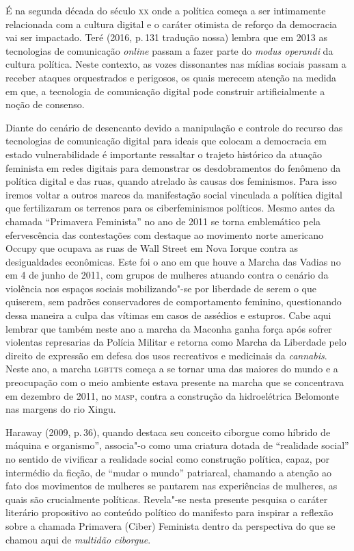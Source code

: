 É na segunda década do século \textsc{xx} onde a política começa a ser
intimamente relacionada com a cultura digital e o caráter otimista de
reforço da democracia vai ser impactado. Teré (2016, p.\,131 tradução
nossa) lembra que em 2013 as tecnologias de comunicação \textit{online} passam a
fazer parte do \textit{modus operandi} da cultura política. Neste
contexto, as vozes dissonantes nas mídias sociais passam a receber
ataques orquestrados e perigosos, os quais merecem atenção na medida em
que, a tecnologia de comunicação digital pode construir artificialmente
a noção de consenso.

Diante do cenário de desencanto devido a manipulação e controle do
recurso das tecnologias de comunicação digital para ideais que colocam a
democracia em estado vulnerabilidade é importante ressaltar o trajeto
histórico da atuação feminista em redes digitais para demonstrar os
desdobramentos do fenômeno da política digital e das ruas, quando
atrelado às causas dos feminismos. Para isso iremos voltar a outros
marcos da manifestação social vinculada a política digital que
fertilizaram os terrenos para os ciberfeminismos políticos. Mesmo antes
da chamada ``Primavera Feminista'' no ano de 2011 se torna emblemático
pela efervescência das contestações com destaque ao movimento norte
americano Occupy que ocupava as ruas de Wall Street em Nova Iorque
contra as desigualdades econômicas. Este foi o ano em que houve a Marcha
das Vadias no em 4 de junho de 2011, com grupos de mulheres atuando
contra o cenário da violência nos espaços sociais mobilizando"-se por
liberdade de serem o que quiserem, sem padrões conservadores de
comportamento feminino, questionando dessa maneira a culpa das vítimas
em casos de assédios e estupros. Cabe aqui lembrar que também neste ano
a marcha da Maconha ganha força após sofrer violentas represarias da
Polícia Militar e retorna como Marcha da Liberdade pelo direito de
expressão em defesa dos usos recreativos e medicinais da
\textit{cannabis}. Neste ano, a marcha \textsc{lgbtts} começa a se tornar uma das
maiores do mundo e a preocupação com o meio ambiente estava presente na
marcha que se concentrava em dezembro de 2011, no \textsc{masp}, contra a
construção da hidroelétrica Belomonte nas margens do rio Xingu.

Haraway (2009, p.\,36), quando destaca seu conceito ciborgue como híbrido
de máquina e organismo'', associa"-o como uma criatura dotada de
``realidade social'' no sentido de vivificar a realidade social como
construção política, capaz, por intermédio da ficção, de ``mudar o
mundo'' patriarcal, chamando a atenção ao fato dos movimentos de
mulheres se pautarem nas experiências de mulheres, as quais são
crucialmente políticas. Revela"-se nesta presente pesquisa o caráter
literário propositivo ao conteúdo político do manifesto para inspirar a
reflexão sobre a chamada Primavera (Ciber) Feminista dentro da
perspectiva do que se chamou aqui de \textit{multidão ciborgue}.

